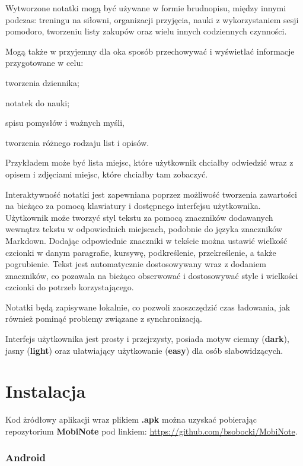 \documentclass[shortabstract]{iithesis}
\begin{document}
Wytworzone notatki mogą być używane w formie brudnopisu, między innymi podczas: treningu na siłowni, organizacji przyjęcia, nauki z wykorzystaniem sesji pomodoro, tworzeniu listy zakupów oraz wielu innych codziennych czynności.

Mogą także w przyjemny dla oka sposób przechowywać i wyświetlać informacje przygotowane w celu:
\begin{compactitem}
 \item tworzenia dziennika;
 \item notatek do nauki;
 \item spisu pomysłów i ważnych myśli,
 \item tworzenia różnego rodzaju list i opisów.
\end{compactitem}
 Przykładem może być lista miejsc, które użytkownik chciałby odwiedzić wraz z opisem i zdjęciami miejsc, które chciałby tam zobaczyć.

Interaktywność notatki jest zapewniana poprzez możliwość tworzenia zawartości na bieżąco za pomocą klawiatury i dostępnego interfejsu użytkownika.
Użytkownik może tworzyć styl tekstu za pomocą znaczników dodawanych wewnątrz tekstu w odpowiednich miejscach, podobnie do języka znaczników Markdown.
Dodając odpowiednie znaczniki w tekście można ustawić wielkość czcionki w danym paragrafie, kursywę, podkreślenie, przekreślenie, a także pogrubienie.
Tekst jest automatycznie dostosowywany wraz z dodaniem znaczników, co pozawala na bieżąco obserwować i dostosowywać style i wielkości czcionki do potrzeb korzystającego.

Notatki będą zapisywane lokalnie, co pozwoli zaoszczędzić czas ładowania, jak również pominąć problemy związane z synchronizacją.

Interfejs użytkownika jest prosty i przejrzysty, posiada motyw ciemny (\textbf{dark}), jasny (\textbf{light}) oraz ułatwiający użytkowanie (\textbf{easy}) dla osób słabowidzących.

\chapter{Instalacja}

Kod żródłowy aplikacji wraz plikiem \textbf{.apk} można uzyskać pobierając repozytorium \textbf{MobiNote} pod linkiem:
\url{https://github.com/bsobocki/MobiNote}.

\subsection{Android}
\end{document}
